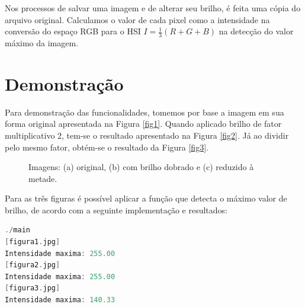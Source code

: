 \documentclass[a4paper, 10pt, conference]{ieeeconf}
\begin{document}
Nos processos de salvar uma imagem e de alterar seu brilho, é feita uma cópia do arquivo original. Calculamos o valor de cada pixel como a intensidade na conversão do espaço RGB para o HSI $I=\frac{1}{3}(R+G+B)$ \cite{rgb} na detecção do valor máximo da imagem.

\section{Demonstração}


Para demonstração das funcionalidades, tomemos por base a imagem em sua forma original apresentada na Figura \ref{fig1}. Quando aplicado brilho de fator multiplicativo 2, tem-se o resultado apresentado na Figura \ref{fig2}. Já ao dividir pelo mesmo fator, obtém-se o resultado da Figura \ref{fig3}.

\begin{figure}[h]
	\centering
	\hspace{0.05cm}
	\hspace{0.05cm}
	\caption{Imagens: (a) original, (b) com brilho dobrado e (c) reduzido à metade.}
	\label{comp}
\end{figure}

Para as três figuras é possível aplicar a função que detecta o máximo valor de brilho, de acordo com a seguinte implementação e resultados:

\begin{lstlisting}[language=C, basicstyle=\footnotesize, frame=single]
./main
[figura1.jpg]
Intensidade maxima: 255.00
[figura2.jpg]
Intensidade maxima: 255.00
[figura3.jpg]
Intensidade maxima: 140.33
\end{lstlisting}
\end{document}
